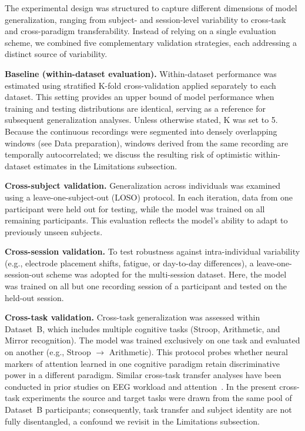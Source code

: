 \documentclass[10pt,letterpaper]{article}
\newcommand{\rev}[1]{\par\noindent\colorbox{yellow}{\parbox{\dimexpr\linewidth-2\fboxsep\relax}{#1}}\par}
\renewcommand{\rev}[1]{#1}
\begin{document}
The experimental design was structured to capture different dimensions of model generalization, ranging from subject- and session-level variability to cross-task and cross-paradigm transferability. Instead of relying on a single evaluation scheme, we combined five complementary validation strategies, each addressing a distinct source of variability.

\textbf{Baseline (within-dataset evaluation).}
Within-dataset performance was estimated using stratified K-fold cross-validation applied separately to each dataset. This setting provides an upper bound of model performance when training and testing distributions are identical, serving as a reference for subsequent generalization analyses. \rev{Unless otherwise stated, K was set to 5. Because the continuous recordings were segmented into densely overlapping windows (see Data preparation), windows derived from the same recording are temporally autocorrelated; we discuss the resulting risk of optimistic within-dataset estimates in the Limitations subsection.}

\textbf{Cross-subject validation.}
Generalization across individuals was examined using a leave-one-subject-out (LOSO) protocol. In each iteration, data from one participant were held out for testing, while the model was trained on all remaining participants. This evaluation reflects the model's ability to adapt to previously unseen subjects.

\textbf{Cross-session validation.}
To test robustness against intra-individual variability (e.g., electrode placement shifts, fatigue, or day-to-day differences), a leave-one-session-out scheme was adopted for the multi-session dataset. Here, the model was trained on all but one recording session of a participant and tested on the held-out session.

\textbf{Cross-task validation.}
Cross-task generalization was assessed within Dataset~B, which includes multiple cognitive tasks (Stroop, Arithmetic, and Mirror recognition). The model was trained exclusively on one task and evaluated on another (e.g., Stroop $\rightarrow$ Arithmetic). This protocol probes whether neural markers of attention learned in one cognitive paradigm retain discriminative power in a different paradigm. Similar cross-task transfer analyses have been conducted in prior studies on EEG workload and attention~\cite{zhang2021cross}. \rev{In the present cross-task experiments the source and target tasks were drawn from the same pool of Dataset~B participants; consequently, task transfer and subject identity are not fully disentangled, a confound we revisit in the Limitations subsection.}
\end{document}
